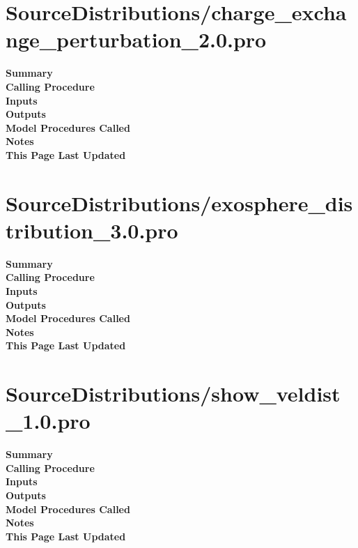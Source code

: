 \documentclass[11pt]{article}
\newcommand\descrip[1]{\textsf{\textbf{\large{#1}}}\\}
\begin{document}
\section{SourceDistributions/charge\_exchange\_perturbation\_2.0.pro}
\label{sec:charge_exchange_perturbation}

\descrip{Summary}

\descrip{Calling Procedure}

\descrip{Inputs}

\descrip{Outputs}

\descrip{Model Procedures Called}

\descrip{Notes}

\descrip{This Page Last Updated}

\clearpage

\section{SourceDistributions/exosphere\_distribution\_3.0.pro}
\label{sec:exosphere_distribution}

\descrip{Summary}

\descrip{Calling Procedure}

\descrip{Inputs}

\descrip{Outputs}

\descrip{Model Procedures Called}

\descrip{Notes}

\descrip{This Page Last Updated}

\clearpage

\section{SourceDistributions/show\_veldist\_1.0.pro} \label{sec:show_veldist}

\descrip{Summary}

\descrip{Calling Procedure}

\descrip{Inputs}

\descrip{Outputs}

\descrip{Model Procedures Called}

\descrip{Notes}

\descrip{This Page Last Updated}

\clearpage
\end{document}
